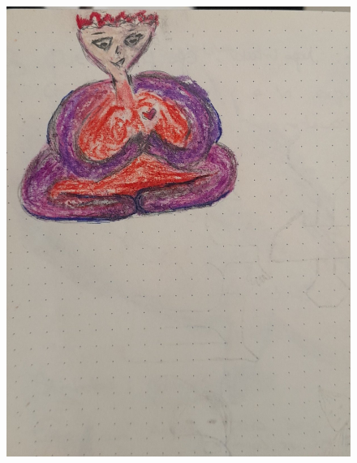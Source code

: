 \documentclass[12pt, a4paper, twoside]{book} %
\begin{document}
\begin{figure}[H]
	\centering
	\includegraphics[width=\textwidth]{./images/1f81324dd8f012.jpg}
\end{figure}
\end{document}
